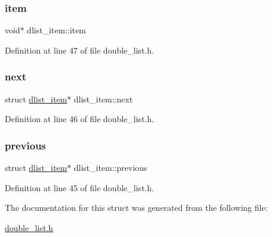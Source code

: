 \subsubsection{\texorpdfstring{item}{item}}
{\footnotesize\ttfamily void$\ast$ dlist\+\_\+item\+::item}



Definition at line 47 of file double\+\_\+list.\+h.

\hypertarget{structdlist__item_a1f0e35d7e536edc712977fa711d91d08}{}\label{structdlist__item_a1f0e35d7e536edc712977fa711d91d08} 
\subsubsection{\texorpdfstring{next}{next}}
{\footnotesize\ttfamily struct \hyperlink{structdlist__item}{dlist\+\_\+item}$\ast$ dlist\+\_\+item\+::next}



Definition at line 46 of file double\+\_\+list.\+h.

\hypertarget{structdlist__item_ae9f34aed963ea0c93ef044c826ca5081}{}\label{structdlist__item_ae9f34aed963ea0c93ef044c826ca5081} 
\subsubsection{\texorpdfstring{previous}{previous}}
{\footnotesize\ttfamily struct \hyperlink{structdlist__item}{dlist\+\_\+item}$\ast$ dlist\+\_\+item\+::previous}



Definition at line 45 of file double\+\_\+list.\+h.



The documentation for this struct was generated from the following file\+:\begin{DoxyCompactItemize}
\item 
\hyperlink{double__list_8h}{double\+\_\+list.\+h}\end{DoxyCompactItemize}

